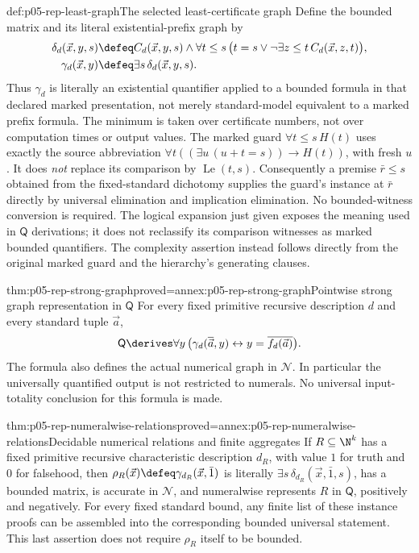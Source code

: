 \begin{hbdefinition}{def:p05-rep-least-graph}{The selected least-certificate graph}
Define the bounded matrix and its literal existential-prefix graph by
\[
\begin{aligned}
 \delta_d(\vec x,y,s)&\defeq C_d(\vec x,y,s)\land
       \forall t\leq s\,
         \bigl(t=s\lor\neg\exists z\leq t\,C_d(\vec x,z,t)\bigr),\\
 \gamma_d(\vec x,y)&\defeq\exists s\,\delta_d(\vec x,y,s).
\end{aligned}
\]
Thus \(\gamma_d\) is literally an existential quantifier applied to a
bounded formula in that declared marked presentation, not merely
standard-model equivalent to a marked prefix formula.
The minimum is taken over certificate numbers, not over computation times
or output values. The marked guard \(\forall t\leq s\,H(t)\) uses exactly
the source abbreviation
\(\forall t((\exists u\,(u+t=s))\to H(t))\), with fresh \(u\).
It does \emph{not} replace its comparison by
\(\operatorname{Le}(t,s)\). Consequently a premise
\(\bar r\leq s\) obtained from the fixed-standard dichotomy supplies
the guard's instance at \(\bar r\) directly by universal elimination
and implication elimination. No bounded-witness conversion is required.
The logical expansion just given exposes the meaning used in \(\mathsf Q\)
derivations; it does not reclassify its comparison witnesses as marked
bounded quantifiers. The complexity assertion instead follows directly
from the original marked guard and the hierarchy's generating clauses.
\end{hbdefinition}

\begin{hbtheorem}{thm:p05-rep-strong-graph}{proved=annex:p05-rep-strong-graph}{Pointwise strong graph representation in \(\mathsf Q\)}
For every fixed primitive recursive description \(d\) and every standard
tuple \(\vec a\),
\[
 \mathsf Q\derives\forall y\,
   \bigl(\gamma_d(\overline{\vec a},y)
                         \leftrightarrow y=\overline{f_d(\vec a)}\bigr).
\]
The formula also defines the actual numerical graph in \(\mathcal N\).
In particular the universally quantified output is not restricted to
numerals. No universal input-totality conclusion for this formula is made.
\end{hbtheorem}

\begin{hbcorollary}{thm:p05-rep-numeralwise-relations}{proved=annex:p05-rep-numeralwise-relations}{Decidable numerical relations and finite aggregates}
If \(R\subseteq\N^k\) has a fixed primitive recursive characteristic
description \(d_R\), with value \(1\) for truth and \(0\) for falsehood,
then
\(\rho_R(\vec x)\defeq\gamma_{d_R}(\vec x,\bar1)\)
is literally \(\exists s\,\delta_{d_R}(\vec x,\bar1,s)\), has a bounded
matrix, is accurate in \(\mathcal N\), and numeralwise represents \(R\)
in \(\mathsf Q\), positively and negatively. For every fixed standard
bound, any finite list of these instance proofs can be assembled into the
corresponding bounded universal statement. This last assertion does not
require \(\rho_R\) itself to be bounded.
\end{hbcorollary}

